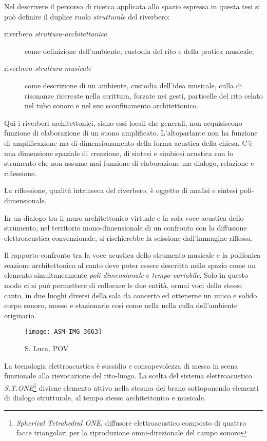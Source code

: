 Nel descrivere il percorso di ricerca applicata allo spazio espressa in questa
tesi si può definire il duplice ruolo \emph{strutturale} del riverbero:

\begin{description}
	\item [riverbero \emph{struttura-architettonica}]
		come definizione dell'ambiente, custodia del rito e della pratica musicale;
	\item [riverbero \emph{struttura-musicale}]
		come descrizione di un ambiente, custodia dell'idea musicale, culla di risonanze
		ricercate nella scrittura, forzate nei gesti, particelle del rito celato nel tubo
		sonoro e nel suo sconfinamento architettonico.
\end{description}

Qui i riverberi architettonici, siano essi locali che generali, non acquisiscono funzione di elaborazione
di un suono amplificato. L'altoparlante non ha funzione di amplificazione ma di dimensionamento della forma
acustica della chiesa. C'è una dimensione spaziale di creazione, di sintesi e simbiosi acustica con lo strumento
che non assume mai funzione di elaborazione ma dialogo, relazione e riflessione.

La riflessione, qualità intrinseca del riverbero, è oggetto di analisi e sintesi poli-dimensionale. 

In un dialogo tra il muro architettonico virtuale e la sola voce acustica dello strumento,
nel territorio mono-dimensionale di un confronto con la diffusione elettroacustica
convenzionale, si rischierebbe la scissione dall'immagine riflessa.

\clearpage

Il rapporto-confronto tra la voce acustica dello strumento musicale e la polifonica reazione 
architettonica al canto deve poter essere descritta nello spazio come un elemento simultaneamente
\emph{poli-dimensionale} e \emph{tempo-variabile}. Solo in questo modo ci si può permettere
di collocare le due entità, ormai voci dello stesso canto, in due luoghi diversi
della sala da concerto ed ottenerne un unico e solido corpo sonoro, mosso e stazionario così
come nella nella culla dell'ambiente originario. 

\begin{figure}[h]
\centering
{\texttt{[image: ASM-IMG\_3663]}}
\caption[S. Luca, POV]{S. Luca, POV}
\label{fig:slucapov}
\end{figure}

La tecnologia elettroacustica è sussidio e consapevolezza di messa in scena funzionale alla
rievocazione del rito-luogo. La scelta del sistema elettroacustico \emph{S.T.ONE}\footnote{\emph{Spherical
Tetrahedral ONE}, diffusore elettroacustico composto di quattro facce triangolari per la riproduzione omni-direzionale
del campo sonoro} diviene elemento attivo nella stesura del brano sottoponendo elementi di dialogo strutturale, al tempo stesso
architettonico e musicale.

